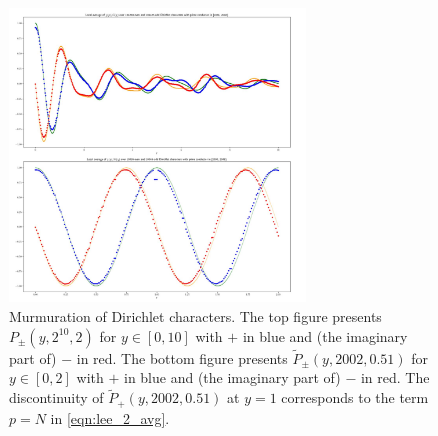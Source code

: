 \begin{figure}[htp] 
\centering
    \includegraphics[width=0.7\textwidth]{src/lop.png}%
    \caption{Murmuration of Dirichlet characters. The top figure presents $P_{\pm}(y, 2^{10}, 2)$ for $y \in [0, 10]$ with $+$ in blue and (the imaginary part of) $-$ in red. The bottom figure presents $\widetilde{P}_{\pm}(y, 2002, 0.51)$ for $y \in [0, 2]$ with $+$ in blue and (the imaginary part of) $-$ in red. The discontinuity of $\widetilde{P}_{+}(y, 2002, 0.51)$ at $y = 1$ corresponds to the term $p = N$ in \eqref{eqn:lee_2_avg}.}
\label{fig:lop}
\end{figure}